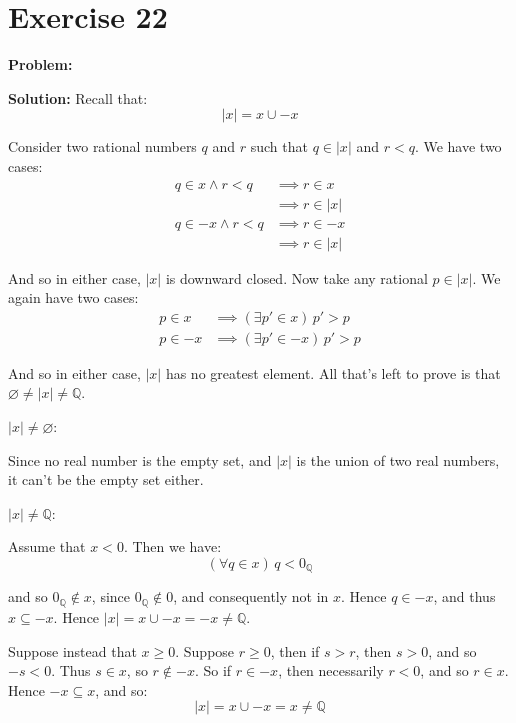 \documentclass{article}
\begin{document}
\section*{Exercise 22}
\noindent\textbf{Problem:} 
\bigskip

\noindent\textbf{Solution:} Recall that:
\begin{equation*}
    |x| = x \cup -x
\end{equation*}

Consider two rational numbers $q$ and $r$ such that $q\in|x|$ and $r<q$. We have two cases:
\begin{align*}
    q\in x\wedge r<q&\implies r\in x\tag{$x$ is downward closed}\\
    &\implies r\in|x|\tag{def. of $|x|$}\\
    q\in -x\wedge r<q&\implies r\in -x\tag{$-x$ is downward closed}\\
    &\implies r\in|x|\tag{def. of $|x|$}
\end{align*}

And so in either case, $|x|$ is downward closed. Now take any rational $p\in|x|$. We again have two cases:
\begin{align*}
    p\in x&\implies(\exists p'\in x)\,p'>p\tag{$x$ has no greatest element}\\
    p\in -x&\implies(\exists p'\in -x)\,p'>p\tag{$-x$ has no greatest element}
\end{align*}

And so in either case, $|x|$ has no greatest element. All that's left to prove is that $\varnothing\not=|x|\not=\mathbb Q$.
\bigskip

$|x|\not=\varnothing$:

Since no real number is the empty set, and $|x|$ is the union of two real numbers, it can't be the empty set either.
\bigskip

$|x|\not=\mathbb Q$:

Assume that $x<0$. Then we have:
\begin{equation*}
    (\forall q\in x)\, q<0_\mathbb Q
\end{equation*}

and so $0_\mathbb Q\not\in x$, since $0_\mathbb Q\not\in 0$, and consequently not in $x$. Hence $q\in -x$, and thus $x\subseteq-x$. Hence $|x|=x\cup-x=-x\not=\mathbb Q$.

Suppose instead that $x\ge0$. Suppose $r\ge0$, then if $s>r$, then $s>0$, and so $-s < 0$. Thus $s\in x$, so $r\not\in -x$. So if $r\in -x$, then necessarily $r < 0$, and so $r\in x$. Hence $-x\subseteq x$,
and so:
\begin{equation*}
    |x| = x\cup -x = x\not=\mathbb Q
\end{equation*}
\end{document}
